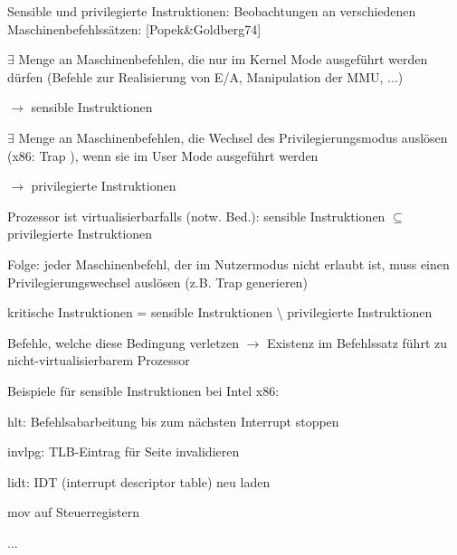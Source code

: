 \documentclass[a4paper]{article}
\begin{document}
\begin{multicols}{3}
    Sensible und privilegierte Instruktionen: Beobachtungen an verschiedenen
    Maschinenbefehlssätzen: [Popek\&Goldberg74]

    \begin{itemize*}
        \item $\exists$ Menge an Maschinenbefehlen, die nur im
        Kernel Mode ausgeführt werden dürfen (Befehle zur Realisierung von
        E/A, Manipulation der MMU, ...)
        \begin{itemize*}
            \item[$\rightarrow$] sensible Instruktionen
        \end{itemize*}
        \item $\exists$ Menge an Maschinenbefehlen, die Wechsel des
        Privilegierungsmodus auslösen (x86: Trap ), wenn sie im User Mode
        ausgeführt werden
        \begin{itemize*}
            \item[$\rightarrow$] privilegierte Instruktionen
        \end{itemize*}
        \item Prozessor ist virtualisierbarfalls (notw. Bed.): sensible
        Instruktionen $\subseteq$ privilegierte Instruktionen
        \item Folge: jeder Maschinenbefehl, der im Nutzermodus nicht erlaubt ist,
        muss einen Privilegierungswechsel auslösen (z.B. Trap generieren)
        \item kritische Instruktionen = sensible Instruktionen \textbackslash{}
        privilegierte Instruktionen
        \begin{itemize*}
            \item Befehle, welche diese Bedingung verletzen $\rightarrow$ Existenz im Befehlssatz führt zu nicht-virtualisierbarem Prozessor
        \end{itemize*}
        \item Beispiele für sensible Instruktionen bei Intel x86:
        \begin{itemize*}
            \item hlt: Befehlsabarbeitung bis zum nächsten Interrupt stoppen
            \item invlpg: TLB-Eintrag für Seite invalidieren
            \item lidt: IDT (interrupt descriptor table) neu laden
            \item mov auf Steuerregistern
            \item ...
        \end{itemize*}

\end{itemize*}
\end{multicols}
\end{document}
